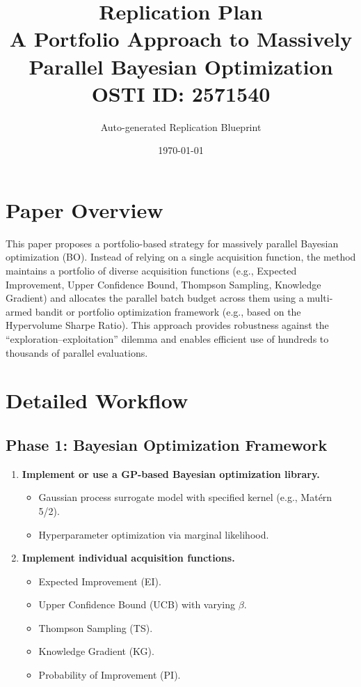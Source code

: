 \documentclass[11pt,a4paper]{article}
\title{\textbf{Replication Plan}\\[0.5em]
\large A Portfolio Approach to Massively Parallel Bayesian Optimization\\[0.3em]
\normalsize OSTI ID: 2571540}
\author{Auto-generated Replication Blueprint}
\date{\today}
\begin{document}
\maketitle
\tableofcontents
\newpage

\section{Paper Overview}
This paper proposes a portfolio-based strategy for massively parallel Bayesian optimization (BO). Instead of relying on a single acquisition function, the method maintains a portfolio of diverse acquisition functions (e.g., Expected Improvement, Upper Confidence Bound, Thompson Sampling, Knowledge Gradient) and allocates the parallel batch budget across them using a multi-armed bandit or portfolio optimization framework (e.g., based on the Hypervolume Sharpe Ratio). This approach provides robustness against the ``exploration--exploitation'' dilemma and enables efficient use of hundreds to thousands of parallel evaluations.

\section{Detailed Workflow}

\subsection{Phase 1: Bayesian Optimization Framework}
\begin{enumerate}[label=\textbf{1.\arabic*}]
  \item \textbf{Implement or use a GP-based Bayesian optimization library.}
    \begin{itemize}
      \item Gaussian process surrogate model with specified kernel (e.g., Mat\'{e}rn 5/2).
      \item Hyperparameter optimization via marginal likelihood.
    \end{itemize}
  \item \textbf{Implement individual acquisition functions.}
    \begin{itemize}
      \item Expected Improvement (EI).
      \item Upper Confidence Bound (UCB) with varying $\beta$.
      \item Thompson Sampling (TS).
      \item Knowledge Gradient (KG).
      \item Probability of Improvement (PI).
    \end{itemize}
\end{enumerate}
\end{document}
